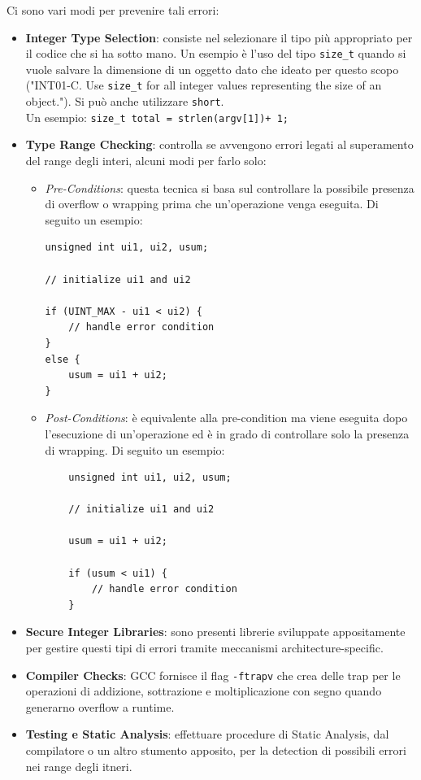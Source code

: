Ci sono vari modi per prevenire tali errori:

\begin{itemize}
    \item \textbf{Integer Type Selection}:
          consiste nel selezionare il tipo più
          appropriato per il codice che si ha sotto mano.
          Un esempio è l'uso del tipo \verb|size_t| quando si vuole salvare la dimensione di un oggetto dato che ideato per questo scopo
          ("INT01-C. Use \verb|size_t| for all integer values representing the size of
          an object.").
          Si può anche utilizzare \verb|short|.\\
          Un esempio: \verb|size_t total = strlen(argv[1])+ 1;|
    \item \textbf{Type Range Checking}:
          controlla se avvengono errori legati al superamento del range degli interi,
          alcuni modi per farlo solo: \begin{itemize}
              \item \textit{Pre-Conditions}:
                    questa tecnica si basa sul controllare la possibile presenza di
                    overflow o wrapping prima che un'operazione venga eseguita.
                    Di seguito un esempio:
                    \begin{lstlisting}
unsigned int ui1, ui2, usum;

// initialize ui1 and ui2

if (UINT_MAX - ui1 < ui2) {
    // handle error condition
}
else {
    usum = ui1 + ui2;
}
                    \end{lstlisting}
              \item \textit{Post-Conditions}:
                    è equivalente alla pre-condition ma viene eseguita dopo
                    l'esecuzione di un'operazione ed è in grado di controllare solo la
                    presenza di wrapping. Di seguito un esempio:
                    \begin{lstlisting}
    unsigned int ui1, ui2, usum;

    // initialize ui1 and ui2

    usum = ui1 + ui2;

    if (usum < ui1) {
        // handle error condition
    }
                    \end{lstlisting}
          \end{itemize}
    \item \textbf{Secure Integer Libraries}:
          sono presenti librerie sviluppate appositamente per gestire questi
          tipi di errori tramite meccanismi architecture-specific.
    \item \textbf{Compiler Checks}:
          GCC fornisce il flag \verb|-ftrapv| che crea delle trap per le
          operazioni di addizione, sottrazione e moltiplicazione con segno
          quando generarno overflow a runtime.
    \item \textbf{Testing e Static Analysis}:
          effettuare procedure di Static Analysis,
          dal compilatore o un altro stumento apposito,
          per la detection di possibili errori nei range degli itneri.
\end{itemize}

